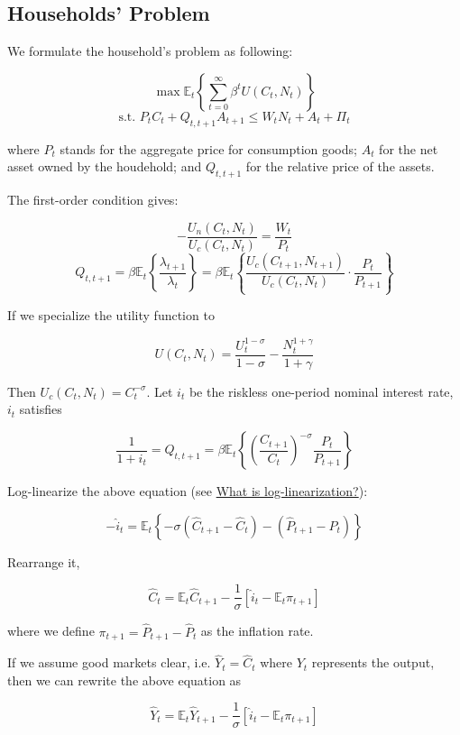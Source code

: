 \documentclass[10pt,a4]{article}
\begin{document}
{\label{711332}}

\subsection{Households' Problem}

{\label{519169}}

We formulate the household's problem as following:

$$\max\mathbb{E}_t\left\{ \sum_{t=0}^{\infty}\beta^tU(C_t,N_t)\right\}$$
$$\textrm{s.t. } P_tC_t + Q_{t,t+1}A_{t+1} \le W_tN_t + A_t + \Pi_t $$

where $P_t$ stands for the aggregate price for consumption goods; $A_t$ for the net asset owned by the houdehold; and $Q_{t,t+1}$ for the relative price of the assets.

The first-order condition gives:

$$ -\frac{U_n(C_t, N_t)}{U_c(C_t, N_t)} = \frac{W_t}{P_t} $$
$$ Q_{t,t+1} = \beta\mathbb{E}_t\left\{\frac{\lambda_{t+1}}{\lambda_t}\right\} = \beta\mathbb{E}_t\left\{\frac{U_c(C_{t+1},N_{t+1})}{U_c(C_t, N_t)}\cdot\frac{P_t}{P_{t+1}}\right\}$$

If we specialize the utility function to

$$ U(C_t,N_t) = \frac{U_t^{1-\sigma}}{1-\sigma} - \frac{N_t^{1+\gamma}}{1+\gamma} $$

Then $U_c(C_t,N_t) = C_t^{-\sigma}$. Let $i_t$ be the riskless one-period nominal interest rate, $i_t$ satisfies 

$$ \frac{1}{1+i_t} = Q_{t,t+1} = \beta\mathbb{E}_t\left\{\left(\frac{C_{t+1}}{C_t}\right)^{-\sigma}\frac{P_t}{P_{t+1}}\right\} $$

Log-linearize the above equation (see \href{http://www.columbia.edu/~nc2371/teaching/R9.pdf}{What is log-linearization?}):

$$ -\hat i_t = \mathbb{E}_t \left\{-\sigma(\hat C_{t+1}-\hat C_t) - (\hat P_{t+1}-\hat P_t) \right\} $$

Rearrange it,

$$ \hat C_t = \mathbb{E}_t\hat C_{t+1} - \frac{1}{\sigma}[\hat i_{t} - \mathbb{E}_t\pi_{t+1}]$$

where we define $\pi_{t+1}=\hat P_{t+1} - \hat P_t$ as the inflation rate.

If we assume good markets clear, i.e. $\hat Y_t = \hat C_t $ where $Y_t$ represents the output, then we can rewrite the above equation as

$$ \hat Y_t = \mathbb{E}_t\hat Y_{t+1} - \frac{1}{\sigma}[\hat i_{t} - \mathbb{E}_t\pi_{t+1}]$$
\end{document}
